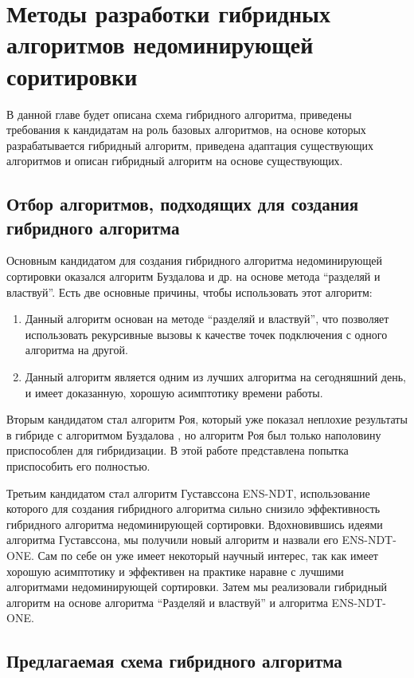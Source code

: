\chapter{Методы разработки гибридных алгоритмов недоминирующей соритировки}
\label{chapter2}

В данной главе будет описана схема гибридного алгоритма, приведены требования к кандидатам на роль базовых алгоритмов, на основе которых разрабатывается гибридный алгоритм, приведена адаптация существующих алгоритмов и описан гибридный алгоритм на основе существующих. 

\section{Отбор алгоритмов, подходящих для создания гибридного алгоритма}

Основным кандидатом для создания гибридного алгоритма недоминирующей сортировки оказался алгоритм Буздалова и др. на основе метода ``разделяй и властвуй''. Есть две основные причины, чтобы использовать этот алгоритм:

\begin{enumerate}
 \item Данный алгоритм основан на методе ``разделяй и властвуй'', что позволяет использовать рекурсивные вызовы к качестве точек подключения с одного алгоритма на другой.
 \item Данный алгоритм является одним из лучших алгоритма на сегодняшний день, и имеет доказанную, хорошую асимптотику времени работы.
\end{enumerate}

Вторым кандидатом стал алгоритм Роя, который уже показал неплохие результаты в гибриде с алгоритмом Буздалова \cite{Markina}, но алгоритм Роя был только наполовину приспособлен для гибридизации. В этой работе представлена попытка приспособить его полностью. 

Третьим кандидатом стал алгоритм Густавссона ENS-NDT, использование которого для создания гибридного алгоритма сильно снизило эффективность гибридного алгоритма недоминирующей сортировки. Вдохновившись идеями алгоритма Густавссона, мы получили новый алгоритм и назвали его ENS-NDT-ONE. Сам по себе он уже имеет некоторый научный интерес, так как имеет хорошую асимптотику и эффективен на практике наравне с лучшими алгоритмами недоминирующей сортировки. Затем мы реализовали гибридный алгоритм на основе алгоритма ``Разделяй и властвуй'' и алгоритма ENS-NDT-ONE.

\section{Предлагаемая схема гибридного алгоритма}

